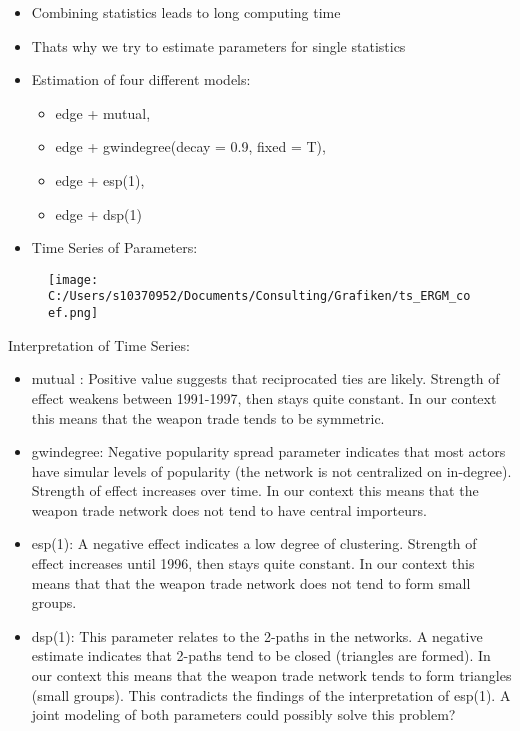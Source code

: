\documentclass{article}
\begin{document}
\begin{itemize}
\item Combining statistics leads to long computing time
\item Thats why we try to estimate parameters for single statistics 
\item Estimation of four different models:
 	\begin{itemize}
	\item edge + mutual,
	\item edge + gwindegree(decay = 0.9, fixed = T),
	\item edge + esp(1),
	\item edge + dsp(1)
	\end{itemize}
\item Time Series of Parameters:
\end {itemize}
\vspace{2.5cm}

\begin{figure}[h]
	\centering
		\texttt{[image: C:/Users/s10370952/Documents/Consulting/Grafiken/ts\_ERGM\_coef.png]}
	\label{fig:ts_ERGM_coef}
\end{figure}


Interpretation of Time Series:
\begin{itemize}
	\item mutual : Positive value suggests that reciprocated ties are likely. Strength of effect weakens between 1991-1997, then stays quite constant. In our context this means that the weapon trade tends to be symmetric.
	\item gwindegree: Negative popularity spread parameter indicates that most actors have simular levels of popularity (the network is not centralized on in-degree). Strength of effect increases over time. In our context this means that the weapon trade network does not tend to have central importeurs. 
	\item esp(1): A negative effect indicates a low degree of clustering. Strength of effect increases until 1996, then stays quite constant. In our context this means that that the weapon trade network does not tend to form small groups.
	\item dsp(1): This parameter relates to the 2-paths in the networks. A negative estimate indicates that 2-paths tend to be closed (triangles are formed). In our context this means that the weapon trade network tends to form triangles (small groups). This contradicts the findings of the interpretation of esp(1). A joint modeling of both parameters could possibly solve this problem?
	
\end{itemize}
\end{document}
